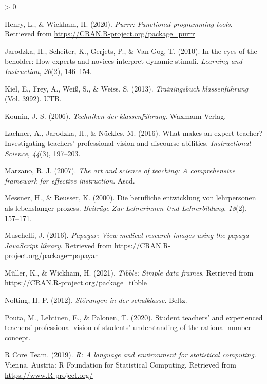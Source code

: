 \documentclass[
  english,
  man,floatsintext]{apa6}
\newlength{\cslhangindent}
\newenvironment{CSLReferences}[2] %
 {%
  \setlength{\parindent}{0pt}
  \ifodd #1 \everypar{\setlength{\hangindent}{\cslhangindent}}\ignorespaces\fi
  \ifnum #2 > 0
  \setlength{\parskip}{#2\baselineskip}
  \fi
 }%
 {}
\begin{document}
\begin{CSLReferences}{1}{0}
\leavevmode\hypertarget{ref-R-purrr}{}%
Henry, L., \& Wickham, H. (2020). \emph{Purrr: Functional programming tools}. Retrieved from \url{https://CRAN.R-project.org/package=purrr}

\leavevmode\hypertarget{ref-jarodzka2010eyes}{}%
Jarodzka, H., Scheiter, K., Gerjets, P., \& Van Gog, T. (2010). In the eyes of the beholder: How experts and novices interpret dynamic stimuli. \emph{Learning and Instruction}, \emph{20}(2), 146--154.

\leavevmode\hypertarget{ref-kiel2013trainingsbuch}{}%
Kiel, E., Frey, A., Weiß, S., \& Weiss, S. (2013). \emph{Trainingsbuch klassenf{ü}hrung} (Vol. 3992). UTB.

\leavevmode\hypertarget{ref-kounin2006techniken}{}%
Kounin, J. S. (2006). \emph{Techniken der klassenf{ü}hrung}. Waxmann Verlag.

\leavevmode\hypertarget{ref-lachner2016makes}{}%
Lachner, A., Jarodzka, H., \& Nückles, M. (2016). What makes an expert teacher? Investigating teachers' professional vision and discourse abilities. \emph{Instructional Science}, \emph{44}(3), 197--203.

\leavevmode\hypertarget{ref-marzano2007art}{}%
Marzano, R. J. (2007). \emph{The art and science of teaching: A comprehensive framework for effective instruction}. Ascd.

\leavevmode\hypertarget{ref-messner2000berufliche}{}%
Messner, H., \& Reusser, K. (2000). Die berufliche entwicklung von lehrpersonen als lebenslanger prozess. \emph{Beitr{ä}ge Zur Lehrerinnen-Und Lehrerbildung}, \emph{18}(2), 157--171.

\leavevmode\hypertarget{ref-R-papayar}{}%
Muschelli, J. (2016). \emph{Papayar: View medical research images using the papaya JavaScript library}. Retrieved from \url{https://CRAN.R-project.org/package=papayar}

\leavevmode\hypertarget{ref-R-tibble}{}%
Müller, K., \& Wickham, H. (2021). \emph{Tibble: Simple data frames}. Retrieved from \url{https://CRAN.R-project.org/package=tibble}

\leavevmode\hypertarget{ref-nolting2012storungen}{}%
Nolting, H.-P. (2012). \emph{St{ö}rungen in der schulklasse}. Beltz.

\leavevmode\hypertarget{ref-pouta2020student}{}%
Pouta, M., Lehtinen, E., \& Palonen, T. (2020). Student teachers' and experienced teachers' professional vision of students' understanding of the rational number concept.

\leavevmode\hypertarget{ref-R-base}{}%
R Core Team. (2019). \emph{R: A language and environment for statistical computing}. Vienna, Austria: R Foundation for Statistical Computing. Retrieved from \url{https://www.R-project.org/}


\end{CSLReferences}
\end{document}
